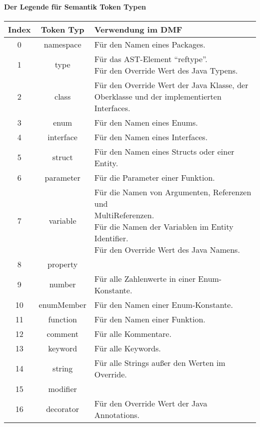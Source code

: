 \documentclass[./einleitung.tex]{subfiles}
\begin{document}
    \paragraph{Der Legende für Semantik Token Typen}
    \begin{center}
        \begin{tabular}{|c|c|p{\mycolwidth}|}
            \hline
            Index & Token Typ & Verwendung im DMF \\
            \hline
            0 & namespace & Für den Namen eines Packages.\\
            \hline
            1 & type & \makecell[l]{Für das AST-Element ``reftype''.\\Für den Override Wert des Java Typens.}\\
            \hline
            2 & class & Für den Override Wert der Java Klasse, der Oberklasse und der implementierten Interfaces.\\
            \hline
            3 & enum & Für den Namen eines Enums.\\
            \hline
            4 & interface & Für den Namen eines Interfaces.\\
            \hline
            5 & struct & Für den Namen eines Structs oder einer Entity.\\
            \hline
            6 & parameter & Für die Parameter einer Funktion.\\
            \hline
            7 & variable & \makecell[l]{Für die Namen von Argumenten, Referenzen und \\MultiReferenzen.\\Für die Namen der Variablen im Entity Identifier.\\Für den Override Wert des Java Namens.}\\
            \hline
            8 & property &\\
            \hline
            9 & number & Für alle Zahlenwerte in einer Enum-Konstante.\\
            \hline
            10 & enumMember & Für den Namen einer Enum-Konstante.\\
            \hline
            11 & function & Für den Namen einer Funktion.\\
            \hline
            12 & comment & Für alle Kommentare.\\
            \hline
            13 & keyword & Für alle Keywords.\\
            \hline
            14 & string & Für alle Strings außer den Werten im Override.\\
            \hline
            15 & modifier & \\
            \hline
            16 & decorator & Für den Override Wert der Java Annotations.\\
            \hline
        \end{tabular}
    \end{center}
\end{document}
